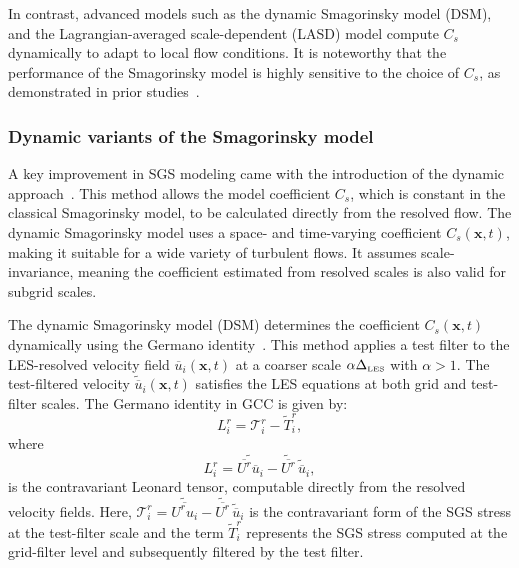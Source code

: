 \documentclass[final,3p]{elsarticle}
\begin{document}
In contrast, advanced models such as the dynamic Smagorinsky model (DSM), and the Lagrangian-averaged scale-dependent (LASD) model compute $C_s$ dynamically to adapt to local flow conditions. It is noteworthy that the performance of the Smagorinsky model is highly sensitive to the choice of $C_s$, as demonstrated in prior studies~\cite{shi2018evaluation}.

\subsubsection{Dynamic variants of the Smagorinsky model}
A key improvement in SGS modeling came with the introduction of the dynamic approach~\cite{germano1991dynamic, germano1992turbulence, lilly1992proposed}. This method allows the model coefficient \( C_s \), which is constant in the classical Smagorinsky model, to be calculated directly from the resolved flow. The dynamic Smagorinsky model uses a space- and time-varying coefficient \( C_s(\bm{x}, t) \), making it suitable for a wide variety of turbulent flows. It assumes scale-invariance, meaning the coefficient estimated from resolved scales is also valid for subgrid scales.

The dynamic Smagorinsky model (DSM) determines the coefficient \( C_s(\mathbf{x}, t) \) dynamically using the Germano identity~\cite{germano1992turbulence}. This method applies a test filter to the LES-resolved velocity field \( \overline{u}_i(\mathbf{x}, t) \) at a coarser scale \( \alpha \Delta_{\text{\tiny LES}} \) with \( \alpha > 1 \). The test-filtered velocity \( \widetilde{\overline{u}}_i(\mathbf{x}, t) \) satisfies the LES equations at both grid and test-filter scales. The Germano identity in GCC is given by:
\begin{equation}
    L^r_i = \mathcal{T}^r_i - \widetilde{T}^r_i,
    \label{eq::germanoIdentity}
\end{equation}
where
\begin{equation}
    L^r_i = \widetilde{\overline{U^r} \overline{u}_i} - \widetilde{\overline{U^r}} \, \widetilde{\overline{u}}_i,
\end{equation}
is the contravariant Leonard tensor, computable directly from the resolved velocity fields. Here, \( \mathcal{T}^r_i = \widetilde{\overline{U^r u_i}} - \widetilde{\overline{U^r}} \, \widetilde{\overline{u}}_i \) is the contravariant form of the SGS stress at the test-filter scale and the term \( \widetilde{T}^r_i \) represents the SGS stress computed at the grid-filter level and subsequently filtered by the test filter.
\end{document}
